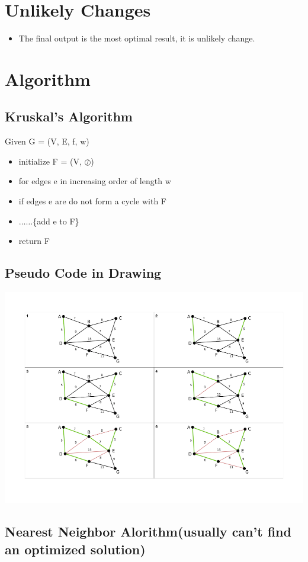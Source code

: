 \documentclass[12pt]{article}
\begin{document}
\section{Unlikely Changes}
\begin{itemize}
    \item The final output is the most optimal result, it is unlikely change.
\end{itemize}

\section{Algorithm}
\subsection{Kruskal’s Algorithm}
Given G = (V, E, f, w) 
\begin{itemize}
    \item initialize F = (V, $\oslash$)
    \item for edges e in increasing order of length w
    \item if edges e are do not form a cycle with F
    \item $\dots\dots$\{add e to F\}
    \item return F
\end{itemize}

\subsection{Pseudo Code in Drawing}
\includegraphics[scale=0.5]{kruskalalgorithm.png}

\subsection{Nearest Neighbor Alorithm(usually can't find an optimized solution)}
\end{document}
